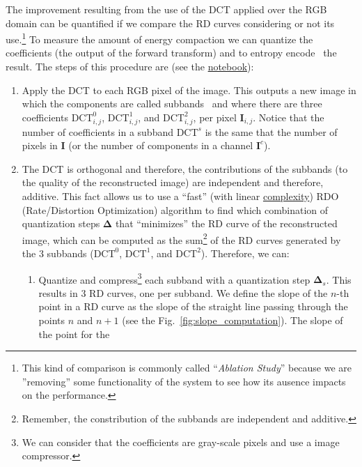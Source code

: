 The improvement resulting from the use of the DCT applied over the RGB
domain can be quantified if we compare the RD curves considering or
not its use.\footnote{This kind of comparison is commonly called
``\emph{Ablation Study}'' because we are ''removing'' some
functionality of the system to see how its ausence impacts on the
performance.} To measure the amount of energy compaction we can
quantize the coefficients (the output of the forward transform) and to
entropy encode~\cite{vruiz__information_theory} the result. The steps
of this procedure are (see the
\href{https://github.com/Sistemas-Multimedia/Sistemas-Multimedia.github.io/blob/master/contents/color_DCT/RGB_DCT.ipynb}{notebook}):
\begin{enumerate}
\item Apply the DCT to each RGB pixel of the image. This outputs a new
  image in which the components are called
  subbands~\cite{vruiz__transform_coding} and where there are three
  coefficients $\text{DCT}^0_{i,j}$, $\text{DCT}^1_{i,j}$, and
  $\text{DCT}^2_{i,j}$, per pixel $\mathbf{I}_{i,j}$. Notice that the
  number of coefficients in a subband $\text{DCT}^s$ is the same that
  the number of pixels in $\mathbf{I}$ (or the number of components in
  a channel $\mathbf{I}^c$).
\item The DCT is orthogonal and therefore, the contributions of the
  subbands (to the quality of the reconstructed image) are independent
  and therefore, additive. This fact allows us to use a ``fast'' (with
  linear
  \href{https://en.wikipedia.org/wiki/Computational_complexity}{complexity})
  RDO (Rate/Distortion Optimization) algorithm to find which
  combination of quantization steps $\mathbf{\Delta}$ that
  ``minimizes'' the RD curve of the reconstructed image, which can be
  computed as the sum\footnote{Remember, the constribution of the
  subbands are independent and additive.} of the RD curves generated
  by the $3$ subbands ($\text{DCT}^0$, $\text{DCT}^1$, and
  $\text{DCT}^2$). Therefore, we can:
  \begin{enumerate}
  \item Quantize and compress\footnote{We can consider that the
  coefficients are gray-scale pixels and use a image compressor.} each
    subband with a quantization step $\mathbf{\Delta}_s$. This results
    in $3$ RD curves, one per subband. We define the slope of the
    $n$-th point in a RD curve as the slope of the straight line
    passing through the points $n$ and $n+1$ (see the
    Fig.~\ref{fig:slope_computation}). The slope of the point for the

\end{enumerate}
\end{enumerate}
